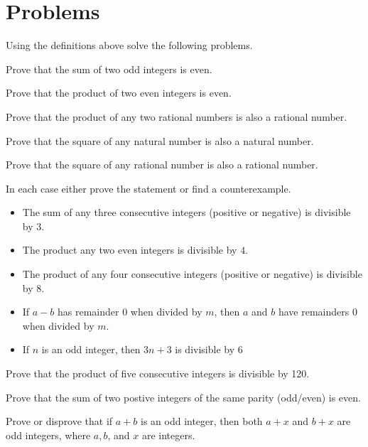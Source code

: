 \documentclass[10pt]{article}
\newenvironment{problem}[2][Problem]{\begin{trivlist}
\item[\hskip \labelsep {\bfseries #1}\hskip \labelsep {\bfseries #2.}]}{\end{trivlist}}
\begin{document}
\section{Problems}
Using the definitions above solve the following problems.
\begin{problem}{1}
Prove that the sum of two odd integers is even.
\end{problem}
\begin{problem}{2}
Prove that the product of two even integers is even.
\end{problem}
\begin{problem}{3}
Prove that the product of any two rational numbers is also a rational number.
\end{problem}
\begin{problem}{4}
Prove that the square of any natural number is also a natural number.
\end{problem}
\begin{problem}{5}
Prove that the square of any rational number is also a rational number.
\end{problem}
\begin{problem}{6}
In each case either prove the statement or find a counterexample.
\begin{itemize}
    \item[(a)] The sum of any three consecutive integers (positive or negative) is divisible by $3$.
    \item[(b)] The product any two even integers is divisible by $4$.
    \item[(c)] The product of any four consecutive integers (positive or negative) is divisible by $8$.
    \item[(d)] If $a - b$ has remainder 0 when divided by $m$, then $a$ and $b$ have remainders $0$ when divided by $m$.
    \item[(e)] If $n$ is an odd integer, then $3n + 3$ is divisible by $6$
\end{itemize}
\end{problem}
\begin{problem}{7}
Prove that the product of five consecutive integers is divisible by 120.
\end{problem}
\begin{problem}{8}
Prove that the sum of two postive integers of the same parity (odd/even) is even.
\end{problem}
\begin{problem}{9}
Prove or disprove that if $a+b$ is an odd integer, then both $a+x$ and $b+x$ are odd integers,
where $a,b$, and $x$ are integers.
\end{problem}
\end{document}
